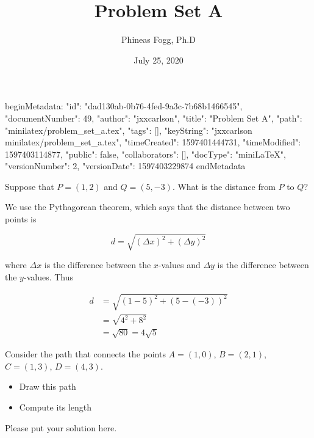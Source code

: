 beginMetadata:
{
    "id": "dad130ab-0b76-4fed-9a3c-7b68b1466545",
    "documentNumber": 49,
    "author": "jxxcarlson",
    "title": "Problem Set A",
    "path": "minilatex/problem_set_a.tex",
    "tags": [],
    "keyString": "jxxcarlson minilatex/problem_set_a.tex",
    "timeCreated": 1597401444731,
    "timeModified": 1597403114877,
    "public": false,
    "collaborators": [],
    "docType": "miniLaTeX",
    "versionNumber": 2,
    "versionDate": 1597403229874
}
endMetadata
\title{Problem Set A}
\author{Phineas Fogg, Ph.D}
\date{July 25, 2020}


\maketitle


\begin{problem}
Suppose that $P = (1,2)$ and $Q = (5,-3)$.  What is the distance from $P$ to $Q$?
\end{problem}

\begin{solution}
We use the Pythagorean theorem, which says that the distance between two points is

\begin{equation}
d = \sqrt{(\Delta x)^2 + (\Delta y)^2}
\end{equation}

where $\Delta x$ is the difference between the $x$-values and $\Delta y$ is the difference between the $y$-values.  Thus

\begin{align}
d &= \sqrt{(1 - 5)^2 + (5 - (-3))^2} \\
  &= \sqrt{4^2 + 8^2} \\
  &= \sqrt{80} = 4\sqrt{5}
\end{align}

\end{solution}

\begin{problem}
Consider the path that connects the points $A = (1,0)$,
$B = (2,1)$, $C = (1,3)$, $D = (4,3)$.

\medskip
\begin{itemize}
\item Draw this path
\item Compute its length
\end{itemize}
\end{problem}

\begin{solution}
Please put your solution here.
\end{solution}

